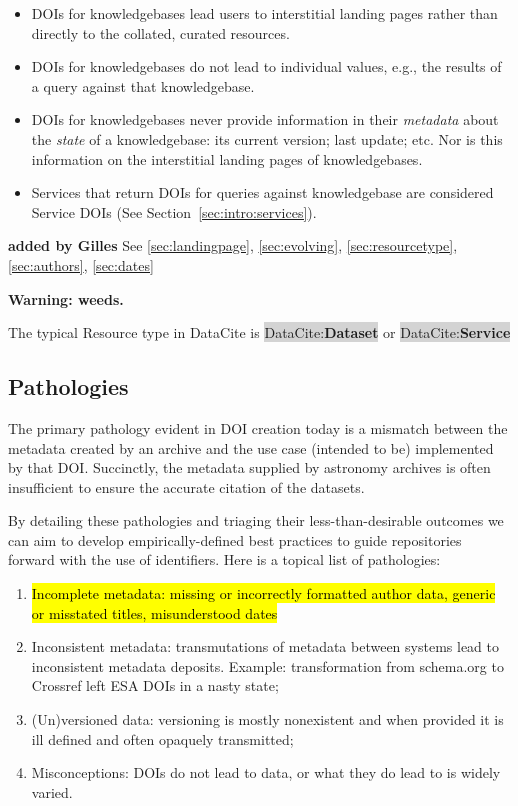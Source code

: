 \documentclass[11pt,a4paper]{ivoa}
\newcommand{\dataciteterm}[1]{\colorbox{lightgray}{DataCite:\textbf{#1}}}
\begin{document}
\begin{itemize}
	\item DOIs for knowledgebases lead users to interstitial landing pages rather than directly to the collated, curated resources. 
	\item DOIs for knowledgebases do not lead to individual values, e.g., the results of a query against that knowledgebase.
	\item DOIs for knowledgebases never provide information in their \textit{metadata} about the \textit{state} of a knowledgebase: its current version; last update; etc. 
	Nor is this information on the interstitial landing pages of knowledgebases.
	\item Services that return DOIs for queries against knowledgebase are considered Service DOIs (See Section~\ref{sec:intro:services}).
\end{itemize}

\textbf{\color{red} added by Gilles}
See \ref{sec:landingpage}, \ref{sec:evolving}, \ref{sec:resourcetype}, \ref{sec:authors}, \ref{sec:dates}

\textbf{Warning: weeds.}

The typical Resource type in DataCite is \dataciteterm{Dataset} or \dataciteterm{Service}

\subsection{Pathologies}
\label{sec:use:patho}

The primary pathology evident in DOI creation today is a mismatch between the metadata created by an archive and the use case (intended to be) implemented by that DOI. 
Succinctly, the metadata supplied by astronomy archives is often insufficient to ensure the accurate citation of the datasets.

By detailing these pathologies and triaging their less-than-desirable outcomes we can aim to develop empirically-defined best practices to guide repositories forward with the use of identifiers.
Here is a topical list of pathologies:

\begin{enumerate}
	\item %
	\hl{Incomplete metadata: missing or incorrectly formatted author data, generic or misstated titles, misunderstood dates}
	\item Inconsistent metadata: transmutations of metadata between systems lead to inconsistent metadata deposits. Example: transformation from schema.org to Crossref left ESA DOIs in a nasty state;
	\item (Un)versioned data: versioning is mostly nonexistent and when provided it is ill defined and often opaquely transmitted;
	\item Misconceptions: DOIs do not lead to data, or what they do lead to is widely varied.
\end{enumerate}
\end{document}
